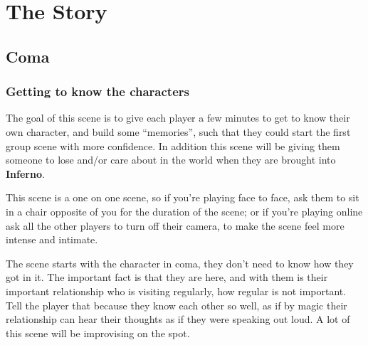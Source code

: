 \documentclass[bg-full]{resources/stylesheets/kult}
\begin{document}
\clearpage %
\section{The Story}%
\label{sec:the_story}

\subsection{Coma}%
\label{sub:coma}

\subsubsection{Getting to know the characters}%
\label{ssub:getting_to_know_the_characters}

The goal of this scene is to give each player a few minutes to get to know their own character, and build some “memories”, such
that they could start the first group scene with more confidence.  In addition this scene will be giving them someone to lose
and/or care about in the world when they are brought into \textbf{Inferno}.

This scene is a one on one scene, so if you're playing face to face, ask them to sit in a chair opposite of you for the
duration of the scene; or if you're playing online ask all the other players to turn off their camera, to make the scene feel
more intense and intimate.

The scene starts with the character in coma, they don't need to know how they got in it.  The important fact is that they are
here, and with them is their important relationship who is visiting regularly, how regular is not important.  Tell the player
that because they know each other so well, as if by magic their relationship can hear their thoughts as if they were speaking
out loud.  A lot of this scene will be improvising on the spot.
\end{document}
